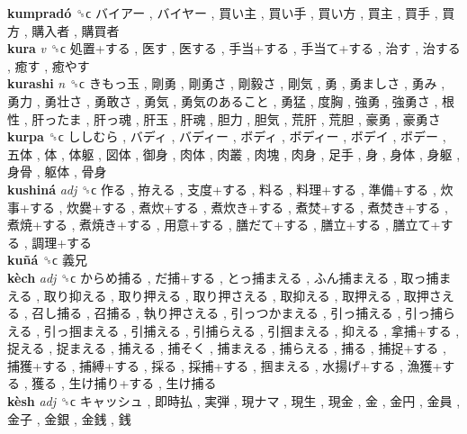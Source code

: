 \textbf{kumpradó} ␝ϲ   バイアー ,  バイヤー ,  買い主 ,  買い手 ,  買い方 ,  買主 ,  買手 ,  買方 ,  購入者 ,  購買者   \\
\textbf{kura} \emph{v}  ␝ϲ   処置+する ,  医す ,  医する ,  手当+する ,  手当て+する ,  治す ,  治する ,  癒す ,  癒やす   \\
\textbf{kurashi} \emph{n}  ␝ϲ   きもっ玉 ,  剛勇 ,  剛勇さ ,  剛毅さ ,  剛気 ,  勇 ,  勇ましさ ,  勇み ,  勇力 ,  勇壮さ ,  勇敢さ ,  勇気 ,  勇気のあること ,  勇猛 ,  度胸 ,  強勇 ,  強勇さ ,  根性 ,  肝ったま ,  肝っ魂 ,  肝玉 ,  肝魂 ,  胆力 ,  胆気 ,  荒肝 ,  荒胆 ,  豪勇 ,  豪勇さ   \\
\textbf{kurpa} ␝ϲ   ししむら ,  バディ ,  バディー ,  ボディ ,  ボディー ,  ボデイ ,  ボデー ,  五体 ,  体 ,  体躯 ,  図体 ,  御身 ,  肉体 ,  肉叢 ,  肉塊 ,  肉身 ,  足手 ,  身 ,  身体 ,  身躯 ,  身骨 ,  躯体 ,  骨身   \\
\textbf{kushiná} \emph{adj}  ␝ϲ   作る ,  拵える ,  支度+する ,  料る ,  料理+する ,  準備+する ,  炊事+する ,  炊爨+する ,  煮炊+する ,  煮炊き+する ,  煮焚+する ,  煮焚き+する ,  煮焼+する ,  煮焼き+する ,  用意+する ,  膳だて+する ,  膳立+する ,  膳立て+する ,  調理+する   \\
\textbf{kuñá} ␝ϲ   義兄   \\
\textbf{kèch} \emph{adj}  ␝ϲ   からめ捕る ,  だ捕+する ,  とっ捕まえる ,  ふん捕まえる ,  取っ捕まえる ,  取り抑える ,  取り押える ,  取り押さえる ,  取抑える ,  取押える ,  取押さえる ,  召し捕る ,  召捕る ,  執り押さえる ,  引っつかまえる ,  引っ捕える ,  引っ捕らえる ,  引っ掴まえる ,  引捕える ,  引捕らえる ,  引掴まえる ,  抑える ,  拿捕+する ,  捉える ,  捉まえる ,  捕える ,  捕そく ,  捕まえる ,  捕らえる ,  捕る ,  捕捉+する ,  捕獲+する ,  捕縛+する ,  採る ,  採捕+する ,  掴まえる ,  水揚げ+する ,  漁獲+する ,  獲る ,  生け捕り+する ,  生け捕る   \\
\textbf{kèsh} \emph{adj}  ␝ϲ   キャッシュ ,  即時払 ,  実弾 ,  現ナマ ,  現生 ,  現金 ,  金 ,  金円 ,  金員 ,  金子 ,  金銀 ,  金銭 ,  銭   \\
